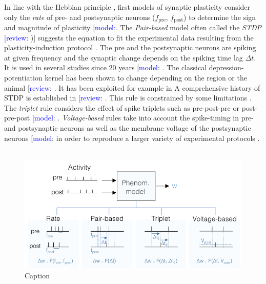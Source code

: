 In line with the Hebbian principle \citep{hebb_organization_1949}, first models of synaptic plasticity consider only the \textit{rate} of pre- and postsynaptic neurons ($f_{\mathrm{pre}}$, $f_{\mathrm{post}}$) to determine the sign and magnitude of plasticity  [\textcolor{blue}{model:}\cite{oja_simplified_1982, bienenstock_theory_1982, udakis_interneuron-specific_2020}. The \textit{Pair-based} model often called the \textit{\acrfull{STDP}}
[\textcolor{blue}{review}: \cite{abbott_synaptic_2000,morrison_phenomenological_2008})] suggests the equation to fit the experimental data resulting from the plasticity-induction protocol \citep{bi_synaptic_1998}. The pre and the postsynaptic neurons are spiking at  given frequency and the synaptic change depends on the spiking time lag $\Delta t$. It is used in several studies since 20 years [\textcolor{blue}{model}: \cite{van_rossum_stable_2000,song_competitive_2000, capone_sleep-like_2019}. The classical depression-potentiation kernel has been shown to change depending on the region or the animal [\textcolor{blue}{review}: \cite{abbott_synaptic_2000}. It has been exploited for example in \citep{liu_effects_2015} A comprehensive history of STDP is established in [\textcolor{blue}{review}: \cite{markram_history_2011, feldman_spike_2020}. This rule is constrained by some limitations \citep{babadi_stability_2016}. The \textit{triplet} rule considers the effect of spike triplets such as pre-post-pre or post-pre-post [\textcolor{blue}{model}: \cite{froemke_spike-timing-dependent_2002, pfister_triplets_2006, costa_unified_2015, gjorgjieva_triplet_2011}. \textit{Voltage-based} rules take into account the spike-timing in pre- and postsynaptic neurons as well as the membrane voltage of the postsynaptic neurons [\textcolor{blue}{model}: \cite{brader_learning_2007, clopath_connectivity_2010} in order to reproduce a larger variety of experimental protocols \citep{sjostrom_rate_2001, artola_different_1990, nevian_spine_2006}. 
~\\




\begin{figure}[h!]
    \centering
    \includegraphics{latex/fig/Methods/ModelRecap_Phenom.pdf}
    \caption{Caption}
    \label{fig:my_label}
\end{figure}


